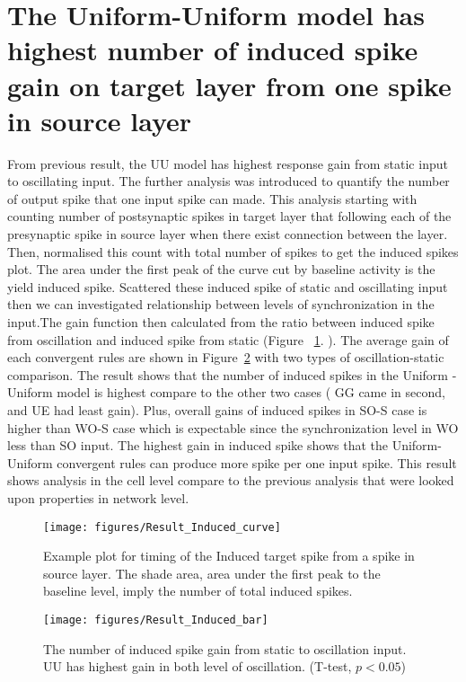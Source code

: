 \section{The Uniform-Uniform model has highest number of induced spike gain on target layer from one spike in source layer}
 From previous result, the UU model  has highest response gain from static input to oscillating input. The further analysis was introduced to quantify the number of output spike that one input spike can made. This analysis starting with counting number of postsynaptic spikes in target layer that following each of the presynaptic spike in source layer when there exist connection between the layer. Then, normalised this count with total number of spikes to get the induced spikes plot. The area under the first peak of the curve cut by baseline activity is the yield induced spike.  Scattered these induced spike of static and oscillating input then we can investigated relationship between levels of synchronization in the input.The gain function then calculated from the ratio between induced spike from oscillation and induced spike from static (Figure ~\ref{fig:InduceCurve}. ). The average gain of each convergent rules are shown in Figure~\ref{fig:InduceBar}  with two types of oscillation-static comparison. The result shows that the number  of induced spikes in the Uniform -Uniform model is highest compare to the other two cases ( GG came in second, and UE had least gain). Plus, overall gains of induced spikes in SO-S case is higher than WO-S case which is expectable since the synchronization level in WO less than SO input. The highest gain in induced spike shows that the Uniform-Uniform convergent rules can produce more spike per one input spike. This result shows analysis in the cell level compare to the previous analysis that were looked upon properties in network level. 



\begin{figure}[!h]
	\centering
	\texttt{[image: figures/Result\_Induced\_curve]}
	\caption{Example plot for timing of the Induced target spike from a spike in source layer. The shade area, area under the first peak  to the baseline level, imply the number of total induced spikes.}
	\label{fig:InduceCurve}
\end{figure}

\begin{figure}[!h]
	\centering
	\texttt{[image: figures/Result\_Induced\_bar]}
	\caption{The number of induced spike gain from static to oscillation input. UU has highest gain in both level of oscillation. (T-test, $p < 0.05$)} %
	\label{fig:InduceBar}
\end{figure}

